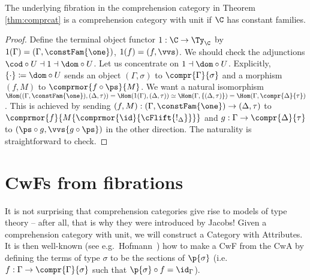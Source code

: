 \documentclass{article}
\begin{document}
\begin{theorem}
  The underlying fibration in the comprehension category in Theorem
  \ref{thm:comprcat} is a comprehension category with unit if $\C$ has
  constant families.
\end{theorem}
\begin{proof}
  Define the terminal object functor $1 : \C \to \Ty_{\C}$ by
  $1(\Gamma) = (\Gamma, \constFam{\one})$, $1(f) = (f, \vvs)$. We
  should check the adjunctions $\cod \circ U \dashv 1 \dashv \dom
  \circ U$. Let us concentrate on $1 \dashv \dom \circ U$. Explicitly,
  $\{\cdot\} \coloneqq \dom \circ U$ sends an object $(\Gamma,
  \sigma)$ to $\compr{\Gamma}{\sigma}$ and a morphism $(f, M)$ to
  $\comprmor{f \circ \ps}{M}$. We want a natural isomorphism
  $\Hom((\Gamma, \constFam{\one}), (\Delta, \tau)) = \Hom(1(\Gamma),
  (\Delta, \tau)) \simeq \Hom(\Gamma, \{(\Delta, \tau)\}) =
  \Hom(\Gamma, \compr{\Delta}{\tau})$.  This is achieved by sending
  $(f, M) : (\Gamma, \constFam{\one}) \to (\Delta, \tau)$ to
  $\comprmor{f}{M\{\comprmor{\id}{\cFlift{!_{\Delta}}}\}}$ and $g :
  \Gamma \to \compr{\Delta}{\tau}$ to $(\ps \circ g, \vvs\{g \circ
  \ps\})$ in the other direction. The naturality is straightforward to
  check.
\end{proof}

\section{CwFs from fibrations}

It is not surprising that comprehension categories give rise to models
of type theory -- after all, that is why they were introduced by
Jacobs! Given a comprehension category with unit, we will construct a
Category with Attributes. It is then well-known (see e.g.\
Hofmann~\cite[Sect.\ 3.2]{hofmann1997syntaxsemantics}) how to make a
CwF from the CwA by defining the terms of type $\sigma$ to be the
sections of $\p{\sigma}$ (i.e.\ $f : \Gamma \to
\compr{\Gamma}{\sigma}$ such that $\p{\sigma} \circ f =
\id_{\Gamma}$).
\end{document}
